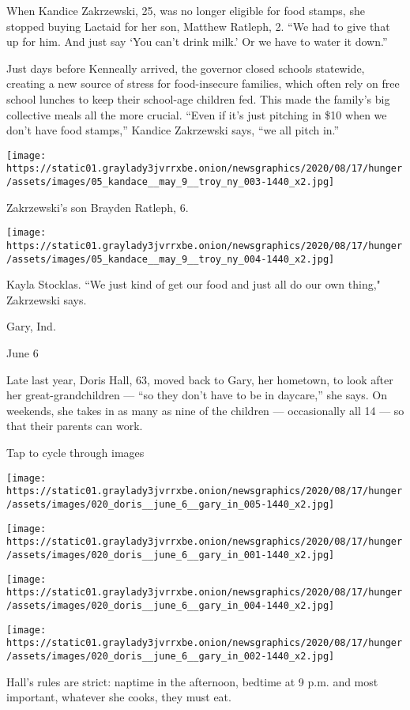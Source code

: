 When Kandice Zakrzewski, 25, was no longer eligible for food stamps, she
stopped buying Lactaid for her son, Matthew Ratleph, 2. ``We had to give
that up for him. And just say `You can't drink milk.' Or we have to
water it down.''

Just days before Kenneally arrived, the governor closed schools
statewide, creating a new source of stress for food-insecure families,
which often rely on free school lunches to keep their school-age
children fed. This made the family's big collective meals all the more
crucial. ``Even if it's just pitching in \$10 when we don't have food
stamps,'' Kandice Zakrzewski says, ``we all pitch in.''

\texttt{[image: https://static01.graylady3jvrrxbe.onion/newsgraphics/2020/08/17/hunger/assets/images/05\_kandace\_\_may\_9\_\_troy\_ny\_003-1440\_x2.jpg]}

Zakrzewski's son Brayden Ratleph, 6.

\texttt{[image: https://static01.graylady3jvrrxbe.onion/newsgraphics/2020/08/17/hunger/assets/images/05\_kandace\_\_may\_9\_\_troy\_ny\_004-1440\_x2.jpg]}

Kayla Stocklas. ``We just kind of get our food and just all do our own
thing," Zakrzewski says.

Gary, Ind.

June 6

Late last year, Doris Hall, 63, moved back to Gary, her hometown, to
look after her great-grandchildren --- ``so they don't have to be in
daycare,'' she says. On weekends, she takes in as many as nine of the
children --- occasionally all 14 --- so that their parents can work.

Tap to cycle through images

\texttt{[image: https://static01.graylady3jvrrxbe.onion/newsgraphics/2020/08/17/hunger/assets/images/020\_doris\_\_june\_6\_\_gary\_in\_005-1440\_x2.jpg]}

\texttt{[image: https://static01.graylady3jvrrxbe.onion/newsgraphics/2020/08/17/hunger/assets/images/020\_doris\_\_june\_6\_\_gary\_in\_001-1440\_x2.jpg]}

\texttt{[image: https://static01.graylady3jvrrxbe.onion/newsgraphics/2020/08/17/hunger/assets/images/020\_doris\_\_june\_6\_\_gary\_in\_004-1440\_x2.jpg]}

\texttt{[image: https://static01.graylady3jvrrxbe.onion/newsgraphics/2020/08/17/hunger/assets/images/020\_doris\_\_june\_6\_\_gary\_in\_002-1440\_x2.jpg]}

Hall's rules are strict: naptime in the afternoon, bedtime at 9 p.m. and
most important, whatever she cooks, they must eat.

